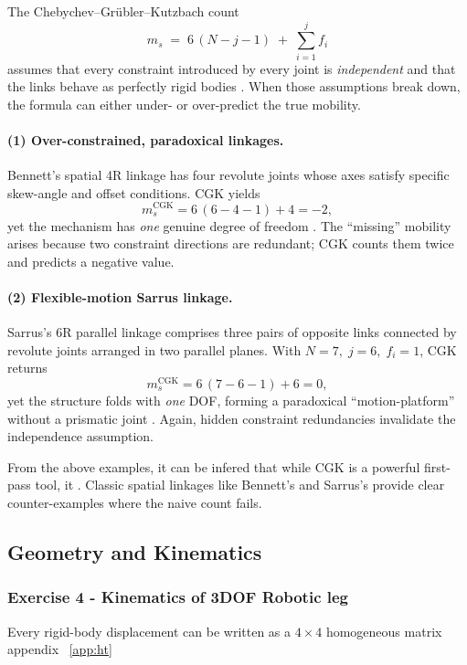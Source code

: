 \documentclass[12pt,a4paper]{article}
\begin{document}
The Chebychev–Grübler–Kutzbach count
\[
m_s \;=\; 6\,(N-j-1)\;+\;\sum_{i=1}^{j}f_i
\]
assumes that every constraint introduced by every joint is \emph{independent}
and that the links behave as perfectly rigid bodies
\cite[Ch.~1]{Hunt1978}.  When those assumptions break down, the formula
can either under- or over-predict the true mobility.

\paragraph{(1) Over-constrained, paradoxical linkages.}
Bennett’s spatial 4R linkage has four revolute joints whose axes satisfy
specific skew-angle and offset conditions.
CGK yields
\[
m_s^{\text{CGK}} = 6\,(6-4-1)+4 = -2,
\]
yet the mechanism has \emph{one} genuine degree of freedom
\cite[Sec.~3.3.3]{Tsai1999}.  
The “missing” mobility arises because two constraint directions are
redundant; CGK counts them twice and predicts a negative value.

\paragraph{(2) Flexible-motion Sarrus linkage.}
Sarrus’s 6R parallel linkage comprises three pairs of opposite links
connected by revolute joints arranged in two parallel planes.
With \(N=7,\;j=6,\;f_i=1\), CGK returns
\[
m_s^{\text{CGK}} = 6\,(7-6-1)+6 = 0,
\]
yet the structure folds with \emph{one} DOF, forming a paradoxical
“motion-platform” without a prismatic joint
\cite[p.~148]{McCarthy2000}.  
Again, hidden constraint redundancies invalidate the independence
assumption.

From the above examples, it can be infered that while CGK is a powerful first-pass tool, it .  Classic spatial linkages like Bennett’s and Sarrus’s provide
clear counter-examples where the naive count fails.

\subsection{Geometry and Kinematics}
\subsubsection*{Exercise 4 -  Kinematics of 3DOF Robotic leg}

Every rigid-body displacement can be written as a $4\times4$ homogeneous matrix  appendix ~\ref{app:ht}
\end{document}
